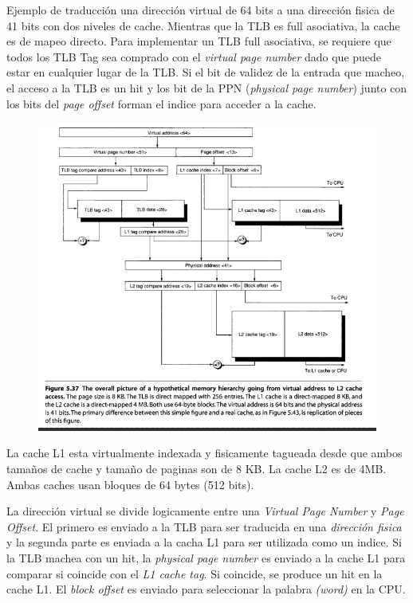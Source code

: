 \documentclass{article}
\begin{document}
Ejemplo de traducción una dirección virtual de 64 bits a una dirección fisica de 41 bits con dos niveles de cache.
Mientras que la TLB es full asociativa, la cache es de mapeo directo. Para implementar un TLB full asociativa, se requiere que todos los TLB Tag sea comprado con el \textit{virtual page number} dado que puede estar en cualquier lugar de la TLB.
Si el bit de validez de la entrada que macheo, el acceso a la TLB es un hit y los bit de la PPN (\textit{physical page number}) junto con los bits del \textit{page offset} forman el indice para acceder a la cache.

\begin{figure}[h!]
    \includegraphics[width=\linewidth]{imagenes/CacheVirtualIndexadoTagFisico.png}
\end{figure}

La cache L1 esta virtualmente indexada y fisicamente tagueada desde que ambos tamaños de cache y tamaño de paginas son de 8 KB. La cache L2 es de 4MB. Ambas caches usan bloques de 64 bytes (512 bits). 

La dirección virtual se divide logicamente entre una \textit{Virtual Page Number} y \textit{Page Offset}. El primero es enviado a la TLB para ser traducida en una \textit{dirección fisica} y la segunda parte es enviada a la cacha L1 para ser utilizada como un indice.
Si la TLB machea con un hit, la \textit{physical page number} es enviado a la cache L1 para comparar si coincide con el \textit{L1 cache tag}. Si coincide, se produce un hit en la cache L1. El \textit{block offset} es enviado para seleccionar la palabra \textit{(word)} en la CPU.
\end{document}

